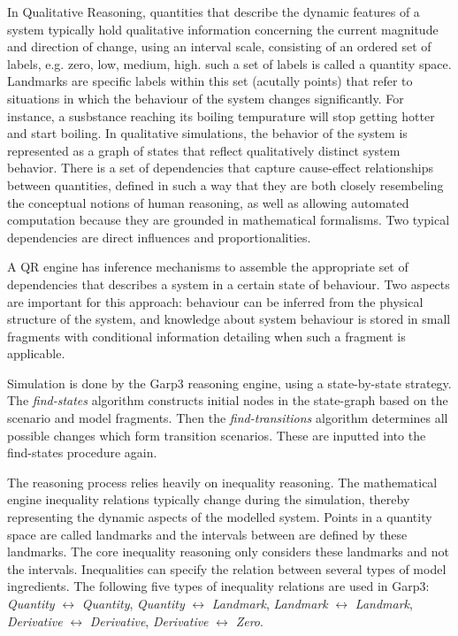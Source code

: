 \documentclass{article} %
\begin{document}
In Qualitative Reasoning, quantities that describe the dynamic features of a 
system typically hold qualitative information concerning the current magnitude 
and direction of change, using an interval scale, consisting of an ordered set 
of labels, e.g. {zero, low, medium, high}. such a set of labels
is called a quantity space. Landmarks are specific labels within this set
(acutally points) that refer to situations in which the behaviour of the system
changes significantly. For instance, a susbstance reaching its boiling
tempurature will stop getting hotter and start boiling. In qualitative
simulations, the behavior of the system is represented as a graph of states
that reflect qualitatively distinct system behavior. There is a set of
dependencies that capture cause-effect relationships between quantities,
defined in such a way that they are both closely resembeling the conceptual
notions of human reasoning, as well as allowing automated computation because
they are grounded in mathematical formalisms. Two typical dependencies are
direct influences and proportionalities.

A QR engine has inference mechanisms to assemble the appropriate set of
dependencies that describes a system in a certain state of behaviour. Two
aspects are important for this approach: behaviour can be inferred from the
physical structure of the system, and knowledge about system behaviour is
stored in small fragments with conditional information detailing when such a
fragment is applicable.

\vspace{0.8em}

Simulation is done by the Garp3 reasoning engine, using a state-by-state
strategy. The \emph{find-states} algorithm constructs initial nodes in the 
state-graph based on the scenario and model fragments. Then the 
\emph{find-transitions} algorithm determines all possible changes which form 
transition scenarios. These are inputted into the find-states procedure again.  

The reasoning process relies heavily on inequality reasoning.
The mathematical engine inequality relations typically change during the 
simulation, thereby representing the dynamic aspects of the modelled system. 
Points in a quantity 
space are called landmarks and the intervals between are defined by these
landmarks. The core inequality reasoning only considers these landmarks and not
the intervals. Inequalities can specify the relation between several types of
model ingredients. The following five types of inequality relations are used in
Garp3: \emph{Quantity} $\leftrightarrow$ \emph{Quantity}, \emph{Quantity} 
$\leftrightarrow$ \emph{Landmark}, \emph{Landmark} $\leftrightarrow$ 
\emph{Landmark}, \emph{Derivative} $\leftrightarrow$ \emph{Derivative}, 
\emph{Derivative} $\leftrightarrow$ \emph{Zero}.  
\end{document}
